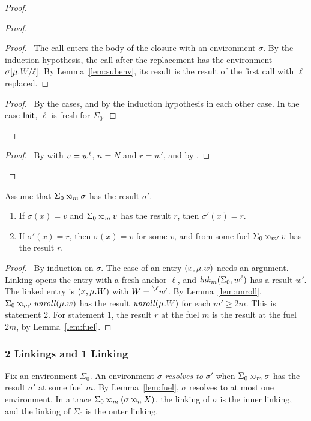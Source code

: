 \begin{proof}
\begin{proof}
\begin{proof}
      \pf\ The call enters the body of the closure with an environment $\sigma$.
      By the induction hypothesis, the call after the replacement has the environment ${\sigma}[\mu.{W}/{\ell}]$.
      By Lemma~\ref{lem:subenv}, its result is the result of the first call with $\ell$ replaced.
    \end{proof}
    \qedstep
    \begin{proof}
      \pf\ By the cases, and by the induction hypothesis in each other case.
      In the case $\InitE$, $\ell$ is fresh for $\Sigma_0$.
    \end{proof}
  \end{proof}
  \qedstep
  \begin{proof}
    \pf\ By  with $v={w}^{\ell}$, $n=N$ and $r=w'$, and by .
  \end{proof}
\end{proof}

\begin{lem}[Read]\label{lem:read}
  Assume that $\Sigma_0\lk{m}\sigma$ has the result $\sigma'$.
  \begin{enumerate}
    \item If $\sigma(x)=v$ and $\Sigma_0\lk{m}v$ has the result $r$, then $\sigma'(x)=r$.
    \item If $\sigma'(x)=r$, then $\sigma(x)=v$ for some $v$, and from some fuel $\Sigma_0\lk{m'}v$ has the result $r$.
  \end{enumerate}
\end{lem}
\begin{proof}
  \pf\ By induction on $\sigma$.
  The case of an entry $(x,\mu.{w})$ needs an argument.
  Linking opens the entry with a fresh anchor $\ell$, and $\mathit{lnk}_{m}(\Sigma_0,{w}^{\ell})$ has a result $w'$.
  The linked entry is $(x,\mu.{W})$ with $W=\prescript{\backslash{\ell}}{}{w'}$.
  By Lemma~\ref{lem:unroll}, $\Sigma_0\lk{m'}\unroll(\muval{w})$ has the result $\mathit{unroll}(\mu.{W})$ for each $m'\ge 2m$.
  This is statement 2.
  For statement 1, the result $r$ at the fuel $m$ is the result at the fuel $2m$, by Lemma~\ref{lem:fuel}.
\end{proof}

\subsubsection{2 Linkings and 1 Linking}

Fix an environment $\Sigma_0$.
An environment $\sigma$ \emph{resolves to} $\sigma'$ when $\Sigma_0\lk{m}\sigma$ has the result $\sigma'$ at some fuel $m$.
By Lemma~\ref{lem:fuel}, $\sigma$ resolves to at most one environment.
In a trace $\Sigma_0\lk{m}(\sigma\lk{n}X)$, the linking of $\sigma$ is the inner linking, and the linking of $\Sigma_0$ is the outer linking.

